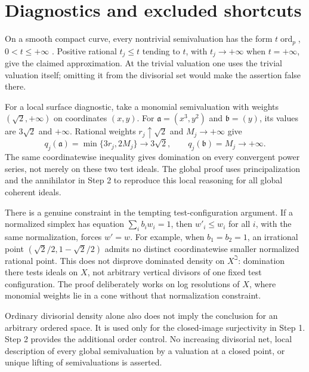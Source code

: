 \section*{Diagnostics and excluded shortcuts}
On a smooth compact curve, every nontrivial semivaluation has the form
\(t\operatorname{ord}_p\), \(0<t\leq+\infty\)
\cite[Example~2.3.3]{MP24}.
Positive rational \(t_j\leq t\) tending to \(t\), with \(t_j\to+\infty\)
when \(t=+\infty\), give the claimed approximation. At the trivial
valuation one uses the trivial valuation itself; omitting it from the
divisorial set would make the assertion false there.

For a local surface diagnostic, take a monomial semivaluation with
weights \((\sqrt2,+\infty)\) on coordinates \((x,y)\). For
\(\mathfrak a=(x^3,y^2)\) and \(\mathfrak b=(y)\), its values are
\(3\sqrt2\) and \(+\infty\). Rational weights
\(r_j\uparrow\sqrt2\) and \(M_j\to+\infty\) give
\[
 q_j(\mathfrak a)=\min\{3r_j,2M_j\}\longrightarrow3\sqrt2,\qquad
 q_j(\mathfrak b)=M_j\longrightarrow+\infty.
\]
The same coordinatewise inequality gives domination on every
convergent power series, not merely on these two test ideals.
The global proof uses principalization and the annihilator in Step 2
to reproduce this local reasoning for all global coherent ideals.

There is a genuine constraint in the tempting test-configuration
argument. If a normalized simplex has equation
\(\sum_i b_i w_i=1\), then \(w'_i\leq w_i\) for all \(i\), with the
same normalization, forces \(w'=w\). For example, when
\(b_1=b_2=1\), an irrational point
\((\sqrt2/2,1-\sqrt2/2)\) admits no distinct coordinatewise smaller
normalized rational point. This does not disprove dominated density
on \(X^\beth\): domination there tests ideals on \(X\), not arbitrary
vertical divisors of one fixed test configuration.
The proof deliberately works on log resolutions of \(X\), where
monomial weights lie in a cone without that normalization constraint.

Ordinary divisorial density alone also does not imply the conclusion
for an arbitrary ordered space. It is used only for the closed-image
surjectivity in Step 1. Step 2 provides the additional order control.
No increasing divisorial net, local description of every global
semivaluation by a valuation at a closed point, or unique lifting of
semivaluations is asserted.

